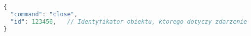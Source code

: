 \begin{lstlisting}[language=JavaScript,numbers=none]
{
  "command": "close",
  "id": 123456,   // Identyfikator obiektu, ktorego dotyczy zdarzenie
}
\end{lstlisting} 